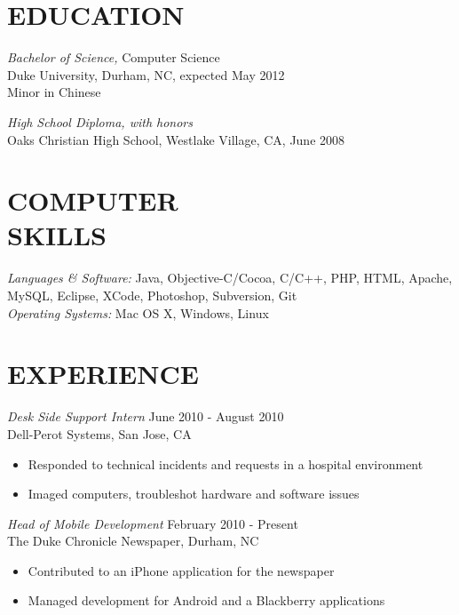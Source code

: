 \documentclass[line,margin]{res}
\begin{document}
	\setlength{\pdfpageheight}{\paperheight}
	\setlength{\pdfpagewidth}{\paperwidth}
\address{Duke University, Box 94807, Durham, NC 27708}
\address{alex@galonsky.com \hspace{.93in} REDACTED}

 
\begin{resume}
\section{EDUCATION} {\sl Bachelor of Science,} Computer Science \\
                Duke University, Durham, NC, 
                expected May 2012 \\
				Minor in Chinese

				{\sl High School Diploma, with honors} \\
				Oaks Christian High School, Westlake Village, CA, June 2008
 
 
\section{COMPUTER \\ SKILLS} {\sl Languages \& Software:} Java, Objective-C/Cocoa, C/C++, PHP, HTML, Apache, MySQL, Eclipse, XCode, Photoshop, Subversion, Git \\
                {\sl Operating Systems:} Mac OS X, Windows, Linux
 
\section{EXPERIENCE} 
				
	{\sl Desk Side Support Intern} \hfill June 2010 - August 2010 \\
                Dell-Perot Systems, San Jose, CA
                 \begin{itemize}  \itemsep -2pt %
                 \item Responded to technical incidents and requests in a hospital environment
		 \item Imaged computers, troubleshot hardware and software issues
                \end{itemize}

	{\sl Head of Mobile Development} \hfill February 2010 - Present \\
                The Duke Chronicle Newspaper, Durham, NC
                 \begin{itemize}  \itemsep -2pt %
                 \item Contributed to an iPhone application for the newspaper
				 \item Managed development for Android and a Blackberry applications
                \end{itemize}


\end{resume}
\end{document}
